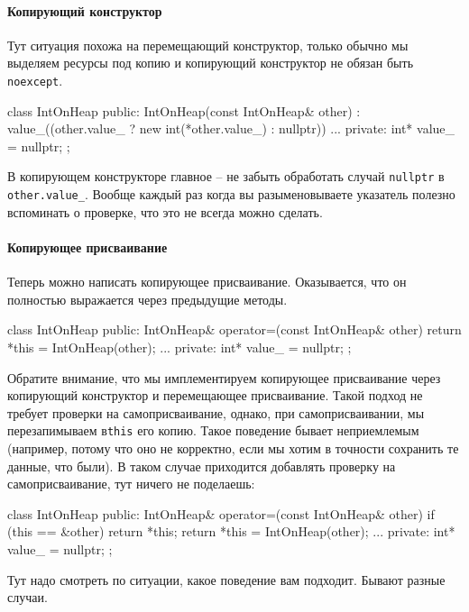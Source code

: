 \paragraph{Копирующий конструктор}
Тут ситуация похожа на перемещающий конструктор, только обычно мы выделяем ресурсы под копию и копирующий конструктор не обязан быть \verb"noexcept".
\begin{cppcode}
class IntOnHeap {
public:
  IntOnHeap(const IntOnHeap& other)
   : value_((other.value_ ? new int(*other.value_) : nullptr)) {}
  ...
private:
  int* value_ = nullptr;
};
\end{cppcode}
В копирующем конструкторе главное -- не забыть обработать случай \verb"nullptr" в \verb"other.value_".
Вообще каждый раз когда вы разыменовываете указатель полезно вспоминать о проверке, что это не всегда можно сделать.

\paragraph{Копирующее присваивание}
Теперь можно написать копирующее присваивание.
Оказывается, что он полностью выражается через предыдущие методы.
\begin{cppcode}
class IntOnHeap {
public:
  IntOnHeap& operator=(const IntOnHeap& other) {
    return *this = IntOnHeap(other);
  }
  ...
private:
  int* value_ = nullptr;
};
\end{cppcode}
Обратите внимание, что мы имплементируем копирующее присваивание через копирующий конструктор и перемещающее присваивание.
Такой подход не требует проверки на самоприсваивание, однако, при самоприсваивании, мы перезапимываем в\verb"this" его копию.
Такое поведение бывает неприемлемым (например, потому что оно не корректно, если мы хотим в точности сохранить те данные, что были).
В таком случае приходится добавлять проверку на самоприсваивание, тут ничего не поделаешь:
\begin{cppcode}
class IntOnHeap {
public:
  IntOnHeap& operator=(const IntOnHeap& other) {
    if (this == &other)
      return *this;
    return *this = IntOnHeap(other);
  }
  ...
private:
  int* value_ = nullptr;
};
\end{cppcode}
Тут надо смотреть по ситуации, какое поведение вам подходит.
Бывают разные случаи.

